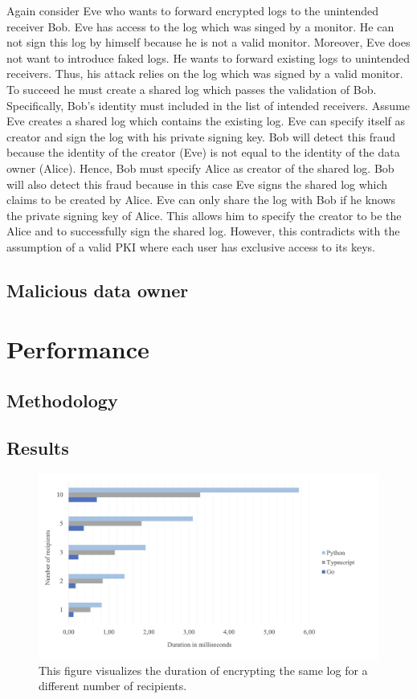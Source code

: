 \documentclass[../main.tex]{subfiles}
\begin{document}
Again consider Eve who wants to forward encrypted logs to the unintended receiver Bob.
Eve has access to the log which was singed by a monitor.
He can not sign this log by himself because he is not a valid monitor.
Moreover, Eve does not want to introduce faked logs.
He wants to forward existing logs to unintended receivers.
Thus, his attack relies on the log which was signed by a valid monitor.
To succeed he must create a shared log which passes the validation of Bob.
Specifically, Bob's identity must included in the list of intended receivers.
Assume Eve creates a shared log which contains the existing log.
Eve can specify itself as creator and sign the log with his private signing key.
Bob will detect this fraud because the identity of the creator (Eve) is not equal to the identity of the data owner (Alice).
Hence, Bob must specify Alice as creator of the shared log.
Bob will also detect this fraud because in this case Eve signs the shared log which claims to be created by Alice.
Eve can only share the log with Bob if he knows the private signing key of Alice.
This allows him to specify the creator to be the Alice and to successfully sign the shared log.
However, this contradicts with the assumption of a valid PKI where each user has exclusive access to its keys.


\subsection{Malicious data owner}

\section{Performance}
\label{sec:evaluation-perf}

\subsection{Methodology}
\subsection{Results}

\begin{figure}[ht]
    \includegraphics[scale=0.3]{../img/07/performance_tests.jpg}
    \centering
    \caption{This figure visualizes the duration of encrypting the same log for a different number of recipients.}
    \label{fig:mutual_encryption}
\end{figure}
\end{document}
